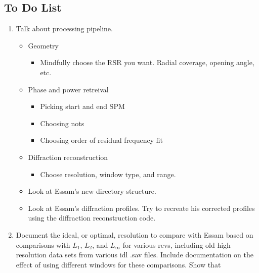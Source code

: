 \documentclass[crop=false,class=book]{standalone}
\begin{document}
        \subsection{To Do List}
            \begin{enumerate}
                \item Talk about processing pipeline.
                \begin{itemize}
                    \item Geometry
                    \begin{itemize}
                        \item Mindfully choose the RSR you want.
                              Radial coverage, opening angle, etc.
                    \end{itemize}
                    \item Phase and power retreival
                    \begin{itemize}
                        \item Picking start and end SPM
                        \item Choosing nots
                        \item Choosing order of residual frequency fit
                    \end{itemize}
                    \item Diffraction reconstruction
                    \begin{itemize}
                        \item Choose resolution, window type, and range.
                    \end{itemize}
                    \item Look at Essam's new directory structure.
                    \item Look at Essam's diffraction profiles. Try to recreate his corrected profiles using the diffraction reconstruction code.
                \end{itemize}
                \item Document the ideal, or optimal, resolution
                      to compare
                      with Essam based on comparisons with $L_{1}$,
                      $L_{2}$, and $L_{\infty}$ for various revs,
                      including
                      old high resolution data sets from various idl .sav
                      files. Include documentation on the effect of using
                      different windows for these comparisons. Show that

\end{enumerate}
\end{document}
